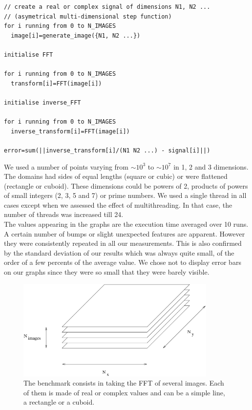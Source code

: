 \documentclass[12pt, a4paper]{article}
\begin{document}
\begin{verbatim}
// create a real or complex signal of dimensions N1, N2 ...
// (asymetrical multi-dimensional step function) 
for i running from 0 to N_IMAGES
  image[i]=generate_image({N1, N2 ...})

initialise FFT

for i running from 0 to N_IMAGES
  transform[i]=FFT(image[i])

initialise inverse_FFT

for i running from 0 to N_IMAGES
  inverse_transform[i]=FFT(image[i])

error=sum(||inverse_transform[i]/(N1 N2 ...) - signal[i]||)
\end{verbatim}

We used a number of points varying from $\sim 10^3$ to $\sim 10^7$ in 1, 2 and 3 dimensions. The domains had sides of equal lengths (square or cubic) or were flattened (rectangle or cuboid). These dimensions could be powers of 2, products of powers of small integers (2, 3, 5 and 7) or prime numbers. We used a single thread in all cases except when we assessed the effect of multithreading. In that case, the number of threads was increased till 24.\\

The values appearing in the graphs are the execution time averaged over 10 runs. A certain number of bumps or slight unexpected features are apparent. However they were consistently repeated in all our measurements. This is also confirmed by the standard deviation of our results which was always quite small, of the order of a few percents of the average value. We chose not to display error bars on our graphs since they were so small that they were barely visible. 

\begin{figure}[H]
\captionsetup{width=0.6\textwidth}
\centering
\includegraphics[height=5cm]{benchmark.pdf}
\caption{The benchmark consists in taking the FFT of several images. Each of them is made of real or complex values and can be a simple line, a rectangle or a cuboid.}
\label{benchmark}
\end{figure}
\end{document}
